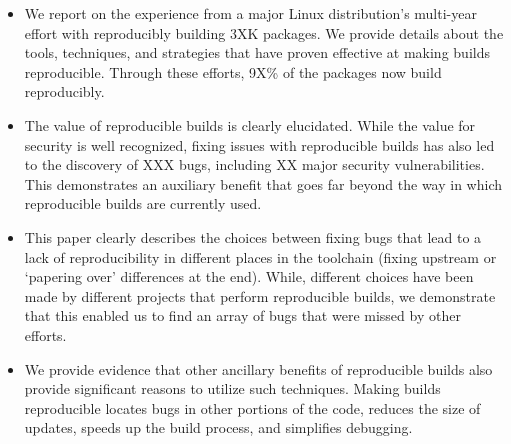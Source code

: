 \begin{itemize}
\item We report on the experience from a major Linux distribution's
multi-year effort with reproducibly building 3XK packages.  We provide
details about the tools, techniques, and strategies that have proven
effective at making builds reproducible.  Through these efforts, 9X\% of 
the packages now build reproducibly.

\item The value of reproducible builds is clearly elucidated.  While the
value for security is well recognized, fixing issues with reproducible
builds has also led to the discovery of XXX bugs, including XX major
security vulnerabilities.  This demonstrates an auxiliary benefit that goes
far beyond the way in which reproducible builds are currently used.

\item This paper clearly describes the choices between fixing bugs that
lead to a lack of reproducibility in different places in the toolchain
(fixing upstream or `papering over' differences at the end).
While, different choices have been made by different projects that perform 
reproducible builds, we demonstrate that this enabled us to find an array
of bugs that were missed by other efforts.

\item We provide evidence that other ancillary benefits of reproducible
builds also provide significant reasons to utilize such techniques.  
Making builds reproducible locates bugs in other portions of the code,
reduces the size of updates, speeds up the build process, and simplifies
debugging.

\end{itemize}


